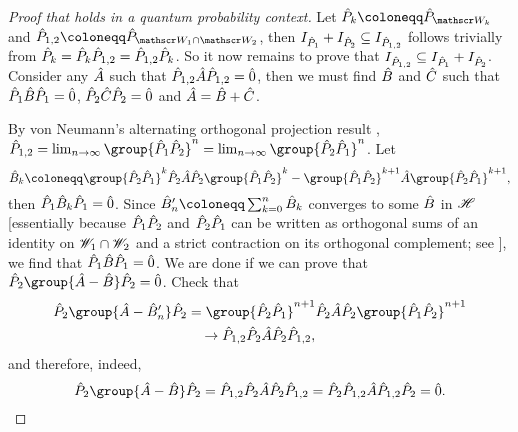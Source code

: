 \documentclass[preprint]{isipta2025}
\begin{document}
\begin{proof}[Proof that  holds in a quantum probability context]
Let \(\projectoron{k}\coloneqq\projector[k]\) and \(\projectoron{1,2}\coloneqq\projectoron{\subspace[1]\cap\subspace[2]}\), then \(\smash{\indifset[\projectoron{1}]}+\smash{\indifset[\projectoron{2}]}\subseteq\smash{\indifset[\projectoron{1,2}]}\) follows trivially from \(\projectoron{k}=\projectoron{k}\projectoron{1,2}=\projectoron{1,2}\projectoron{k}\).
So it now remains to prove that \(\smash{\indifset[\projectoron{1,2}]}\subseteq\smash{\indifset[\projectoron{1}]}+\smash{\indifset[\projectoron{2}]}\).
Consider any \(\measurement{A}\) such that \(\projectoron{1,2}\measurement{A}\projectoron{1,2}=\zero\), then we must find \(\measurement{B}\) and \(\measurement{C}\) such that \(\projectoron{1}\measurement{B}\projectoron{1}=\zero\), \(\projectoron{2}\measurement{C}\projectoron{2}=\zero\) and \(\measurement{A}=\measurement{B}+\measurement{C}\).

By von Neumann's alternating orthogonal projection result \cite[Theorem 13.7]{neumann1950}, \(\projectoron{1,2}=\lim_{n\to\infty}\group{\projectoron{1}\projectoron{2}}^n=\lim_{n\to\infty}\group{\projectoron{2}\projectoron{1}}^n\).
Let
\begin{equation*}
\measurement{B}_k
\coloneqq\group{\projectoron{2}\projectoron{1}}^k\projectoron{2}\measurement{A}\projectoron{2}\group{\projectoron{1}\projectoron{2}}^k
-\group{\projectoron{1}\projectoron{2}}^{k+1}\measurement{A}\group{\projectoron{2}\projectoron{1}}^{k+1},
\end{equation*}
then \(\projectoron{1}\measurement{B}_k\projectoron{1}=\zero\).
Since \(\measurement{B}'_n\coloneqq\sum_{k=0}^n\measurement{B}_k\) converges to some \(\measurement{B}\) in \(\measurements\) [essentially because \(\projectoron{1}\projectoron{2}\) and \(\projectoron{2}\projectoron{1}\) can be written as orthogonal sums of an identity on \(\subspace[1]\cap\subspace[2]\) and a strict contraction on its orthogonal complement; see \cite[Thm.~3.1]{kuo1989:factorisation}], we find that \(\projectoron{1}\measurement{B}\projectoron{1}=\zero\).
We are done if we can prove that \(\projectoron{2}\group{\measurement{A}-\measurement{B}}\projectoron{2}=\zero\).
Check that
\begin{multline*}
\projectoron{2}\group{\measurement{A}-\measurement{B}'_n}\projectoron{2}
=\group{\projectoron{2}\projectoron{1}}^{n+1}\projectoron{2}\measurement{A}\projectoron{2}\group{\projectoron{1}\projectoron{2}}^{n+1}\\
\to\projectoron{1,2}\projectoron{2}\measurement{A}\projectoron{2}\projectoron{1,2},
\end{multline*}
and therefore, indeed,
\begin{equation*}
\projectoron{2}\group{\measurement{A}-\measurement{B}}\projectoron{2}
=\projectoron{1,2}\projectoron{2}\measurement{A}\projectoron{2}\projectoron{1,2}
=\projectoron{2}\projectoron{1,2}\measurement{A}\projectoron{1,2}\projectoron{2}
=\zero.\qedhere
\end{equation*}
\end{proof}
\end{document}
